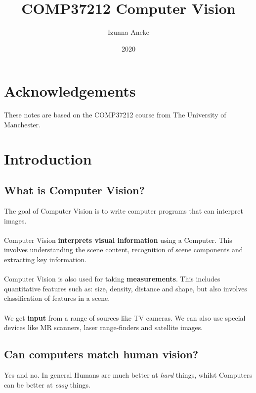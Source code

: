 \documentclass{article}
\title{COMP37212 Computer Vision}
\author{Izunna Aneke}
\date{2020}
\begin{document}
\maketitle

\newpage

\tableofcontents


\newpage

\section*{Acknowledgements}
These notes are based on the COMP37212 course from The University of Manchester.

\newpage
\section{Introduction}
\subsection{What is Computer Vision?}
The goal of Computer Vision is to write computer programs that can interpret images.
\\\\
Computer Vision \textbf{interprets visual information} using a Computer. This involves understanding the scene content, recognition of scene components and extracting key information.
\\\\
Computer Vision is also used for taking \textbf{measurements}. This includes quantitative features such as: size, density, distance and shape, but also involves classification of features in  a scene.
\\\\
We get \textbf{input} from a range of sources like TV cameras. We can also use special devices like MR scanners, laser range-finders and satellite images.

\subsection{Can computers match human vision?}
Yes and no. In general Humans are much better at \textit{hard} things, whilst Computers can be better at \textit{easy} things.
\end{document}
